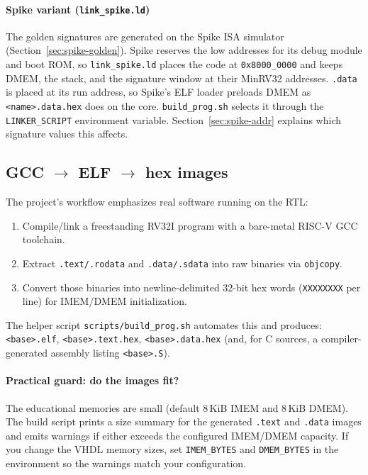\paragraph{Spike variant (\texttt{link\_spike.ld})}
The golden signatures are generated on the Spike ISA simulator
(Section~\ref{sec:spike-golden}). Spike reserves the low addresses for its debug
module and boot ROM, so \texttt{link\_spike.ld} places the code at
\texttt{0x8000\_0000} and keeps DMEM, the stack, and the signature window at
their MinRV32 addresses. \texttt{.data} is placed at its run address, so Spike's
ELF loader preloads DMEM as \texttt{<name>.data.hex} does on the core.
\texttt{build\_prog.sh} selects it through the \texttt{LINKER\_SCRIPT}
environment variable. Section~\ref{sec:spike-addr} explains which signature
values this affects.

\subsection{GCC $\rightarrow$ ELF $\rightarrow$ hex images}
The project's workflow emphasizes real software running on the RTL:
\begin{enumerate}[leftmargin=*]
  \item Compile/link a freestanding RV32I program with a bare-metal RISC-V GCC toolchain.
  \item Extract \texttt{.text/.rodata} and \texttt{.data/.sdata} into raw binaries via \texttt{objcopy}.
  \item Convert those binaries into newline-delimited 32-bit hex words (\texttt{XXXXXXXX} per line) for IMEM/DMEM initialization.
\end{enumerate}

The helper script \texttt{scripts/build\_prog.sh} automates this and produces:
\texttt{<base>.elf}, \texttt{<base>.text.hex}, \texttt{<base>.data.hex} (and, for
C sources, a compiler-generated assembly listing \texttt{<base>.S}).

\paragraph{Practical guard: do the images fit?}
The educational memories are small (default 8\,KiB IMEM and 8\,KiB DMEM). The build script
prints a size summary for the generated \texttt{.text} and \texttt{.data} images
and emits warnings if either exceeds the configured IMEM/DMEM capacity. If you
change the VHDL memory sizes, set \texttt{IMEM\_BYTES} and \texttt{DMEM\_BYTES}
in the environment so the warnings match your configuration.

